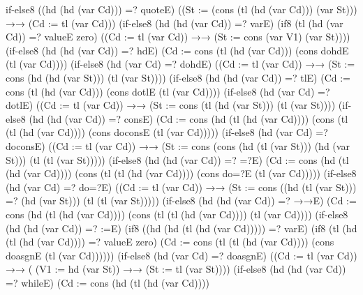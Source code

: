 \iffalse
if-else8 ((hd (hd (var Cd))) =? quoteE)
                   ((St := (cons (tl (hd (var Cd))) (var St)))
                   →→ (Cd := tl (var Cd)))
         (if-else8 (hd (hd (var Cd)) =? varE)
                   (if8 (tl (hd (var Cd)) =? valueE zero)
                        ((Cd := tl (var Cd))
                        →→ (St := cons (var V1) (var St))))
         (if-else8 (hd (hd (var Cd)) =? hdE)
                   (Cd := cons (tl (hd (var Cd)))
                               (cons dohdE (tl (var Cd))))
         (if-else8 (hd (var Cd) =? dohdE)
                   ((Cd := tl (var Cd))
                   →→ (St := cons (hd (hd (var St))) (tl (var St))))
         (if-else8 (hd (hd (var Cd)) =? tlE)
                   (Cd := cons (tl (hd (var Cd)))
                               (cons dotlE (tl (var Cd))))
         (if-else8 (hd (var Cd) =? dotlE)
                   ((Cd := tl (var Cd))
                   →→ (St := cons (tl (hd (var St))) (tl (var St))))
         (if-else8 (hd (hd (var Cd)) =? consE)
                   (Cd := cons (hd (tl (hd (var Cd))))
                               (cons (tl (tl (hd (var Cd))))
                                     (cons doconsE (tl (var Cd)))))
         (if-else8 (hd (var Cd) =? doconsE)
                   ((Cd := tl (var Cd))
                   →→ (St := cons (cons (hd (tl (var St)))
                                  (hd (var St))) (tl (tl (var St)))))
         (if-else8 (hd (hd (var Cd)) =? =?E)
                   (Cd := cons (hd (tl (hd (var Cd))))
                               (cons (tl (tl (hd (var Cd))))
                                     (cons do=?E (tl (var Cd)))))
         (if-else8 (hd (var Cd) =? do=?E)
                   ((Cd := tl (var Cd))
                   →→ (St := cons ((hd (tl (var St))) =? (hd (var St)))
                                  (tl (tl (var St)))))
         (if-else8 (hd (hd (var Cd)) =? →→E)
                   (Cd := cons (hd (tl (hd (var Cd))))
                               (cons (tl (tl (hd (var Cd)))) (tl (var Cd))))
         (if-else8 (hd (hd (var Cd)) =? :=E)
                   (if8 ((hd (hd (tl (hd (var Cd))))) =? varE)
                        (if8 (tl (hd (tl (hd (var Cd)))) =? valueE zero)
                             (Cd := cons (tl (tl (hd (var Cd))))
                                         (cons doasgnE (tl (var Cd))))))
         (if-else8 (hd (var Cd) =? doasgnE)
                   ((Cd := tl (var Cd))
                   →→ ( (V1 := hd (var St)) →→ (St := tl (var St))))
         (if-else8 (hd (hd (var Cd)) =? whileE)
                   (Cd := cons (hd (tl (hd (var Cd))))
